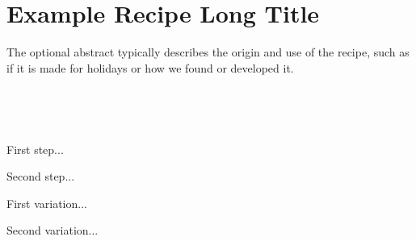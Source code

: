 \section[Example Recipe]{Example Recipe Long Title}
\begin{recipestats}[
	servings=no. of servings,
	preptime=preparation time,
	bakingtime=cooking time,
	source=source or inspiration,
]
\end{recipestats}

\begin{recipeabstract}
	The optional abstract typically describes the origin and use of the recipe, such as if it is made for holidays or how we found or developed it.
\end{recipeabstract}

\begin{ingredientcolumns}
	\begin{ingredientblock}
		\\
	\end{ingredientblock}
	\begin{ingredientblock}
	\\
\end{ingredientblock}
\end{ingredientcolumns}


\begin{preparation}
	\item First step...
	\item Second step...
\end{preparation}

\begin{variation}
	\item First variation...
	\item Second variation...
\end{variation}

\recipeend